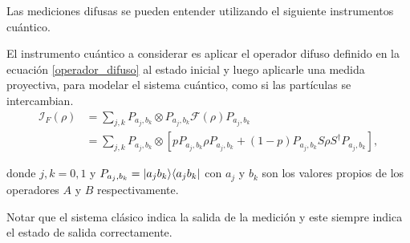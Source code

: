 Las mediciones difusas se pueden entender utilizando el siguiente instrumentos cuántico. 




El instrumento cuántico a considerar es aplicar el operador difuso definido en la ecuación {\ref{operador_difuso}} al estado inicial y luego aplicarle una medida proyectiva, para modelar el sistema cuántico, como  si las partículas se intercambian.\begin{equation}
    \begin{split}
        \mathcal{I}_F(\rho)&=\sum_{j,k}P_{a_j,b_k}\otimes P_{a_j,b_k} \mathcal{F}(\rho) P_{a_j,b_k}\\
        &=\sum_{j,k}P_{a_j,b_k}\otimes[p P_{a_j,b_k}\rho P_{a_j,b_k}+(1-p)P_{a_j,b_k}S\rho S^\dagger P_{a_j,b_k}],
\end{split}
\end{equation}

donde $j,k=0,1$ y $P_{a_j,b_k}=|a_j b_k\rangle \langle a_j b_k|$ con $a_j$ y $b_k$ son los valores propios de los operadores $A$ y $B$ respectivamente.

Notar que el sistema clásico indica la salida de la medición y este siempre indica el estado de salida correctamente.


